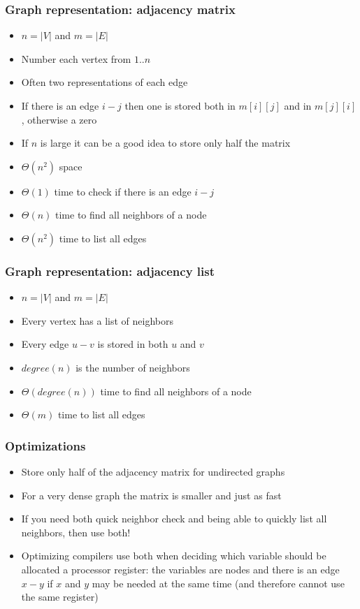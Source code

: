 \documentclass[trans]{beamer}
\begin{document}
\begin{frame}
\frametitle{Graph representation: adjacency matrix}
\begin{itemize}
\item $n = |V|$ and $m = |E|$
\item Number each vertex from $1..n$
\item Often two representations of each edge
\item If there is an edge $i-j$ then
one is stored both in $m[i][j]$ and in $m[j][i]$, otherwise a zero 
\item If $n$ is large it can be a good idea to store only half the matrix
\item $\Theta(n^2)$ space
\item $\Theta(1)$ time to check if there is an edge $i-j$
\item $\Theta(n)$ time to find all neighbors of a node
\item $\Theta(n^2)$ time to list all edges
\end{itemize}
\end{frame}

\begin{frame}
\frametitle{Graph representation: adjacency list}
\begin{itemize}
\item $n = |V|$ and $m = |E|$
\item Every vertex has a list of neighbors
\item Every edge $u-v$ is stored in both $u$ and $v$
\item $degree(n)$ is the number of neighbors
\item $\Theta(degree(n))$ time to find all neighbors of a node
\item $\Theta(m)$ time to list all edges
\end{itemize}
\end{frame}

\begin{frame}
\frametitle{Optimizations}
\begin{itemize}
\item Store only half of the adjacency matrix for undirected graphs
\item For a very dense graph the matrix is smaller and just as fast
\item If you need both quick neighbor check and being able to quickly list all neighbors, then use both!
\item Optimizing compilers use both when deciding which variable should be allocated a processor register:
the variables are nodes and there is an edge $x-y$ if $x$ and $y$ may be needed at the same time (and therefore cannot use the same register)
\end{itemize}
\end{frame}
\end{document}
